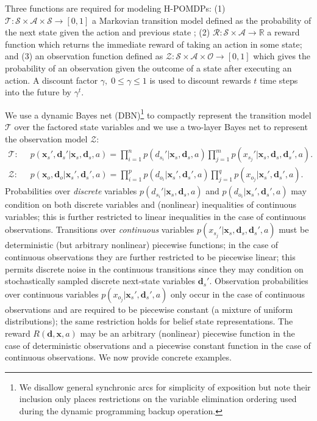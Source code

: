\documentclass{article} %
\renewcommand{\vec}[1]{\mathbf{#1}} %
\newcommand{\xds}{\mathbf{x}_s,\!\mathbf{d}_s}
\newcommand{\xdsp}{\mathbf{x}_s',\!\mathbf{d}_s'}
\newcommand{\xdo}{\mathbf{x}_o,\!\mathbf{d}_o}
\begin{document}
Three functions are required for modeling H-POMDPs: (1) $\mathcal{T}: \mathcal{S} \times \mathcal{A} \times \mathcal{S} \rightarrow  [ 0, 1 ]$ a Markovian transition model defined as the probability of the next state %
given the action and previous state%
; (2)  $\mathcal{R}:\mathcal{S}\times\mathcal{A} \rightarrow \mathbb{R}$ a reward function which returns the immediate reward of taking an action in some state; and (3) an observation function defined as $\mathcal{Z} : \mathcal{S} \times \mathcal{A} \times \mathcal{O} \rightarrow [ 0, 1 ]$  which gives the probability of an observation given the outcome of a state after executing an action.  A discount factor $\gamma, \; 0 \leq \gamma \leq 1$ is used to discount rewards $t$ time steps into the future by $\gamma^t$.

We use a dynamic Bayes net (DBN)\footnote{We disallow general 
  synchronic arcs for simplicity of exposition but
  note their inclusion only places restrictions on the variable
  elimination ordering used during the dynamic programming backup
  operation.} to compactly represent the transition model $\mathcal{T}$ over the
factored state variables and we use a two-layer Bayes net to
represent the observation model $\mathcal{Z}$: {\footnotesize
\begin{align}
\mathcal{T}: \;\; &
p(\xdsp|\xds,a) = 
\prod_{i=1}^n p(d_{s_i}'|\xds,a) \prod_{j=1}^m p(x_{s_j}'|\xds, \vec{d}_s',a). \label{eq:trans_model} \\
\mathcal{Z}: \;\; & 
p(\xdo|\xdsp,a) = 
\prod_{i=1}^p p(d_{o_i}|\xdsp,a) \prod_{j=1}^q p(x_{o_j}|\xdsp,a). \label{eq:obs_model}
\end{align}}
Probabilities over \emph{discrete} variables $p(d_{s_i}'\!|\xds,\!a)$ and
$p(d_{o_i}\!|\xdsp,\!a)$ may condition on both discrete variables and
(nonlinear) inequalities of continuous variables; this is further
restricted to linear inequalities in the case of continuous
observations.  Transitions over \emph{continuous}
variables $p(x_{s_j}'\!|\xds,\!\vec{d}_s',\!a)$ must be deterministic (but
arbitrary nonlinear) piecewise functions;
in the case of continuous observations they are further restricted to
be piecewise linear; this permits discrete noise in the continuous 
transitions since they may condition on stochastically sampled
discrete next-state variables $\vec{d}_s'$.
Observation probabilities over continuous variables $p(x_{o_j}\!|\xdsp,\!a)$ 
only occur in the case of continuous observations and are required to be
piecewise constant (a mixture of uniform distributions); the same
restriction holds for belief state representations.
The reward $R(\vec{d},\vec{x},a)$ may be 
an arbitrary (nonlinear) piecewise function in the case of
deterministic observations and a piecewise constant function in the
case of continuous observations.  
We now provide concrete examples.
\end{document}
